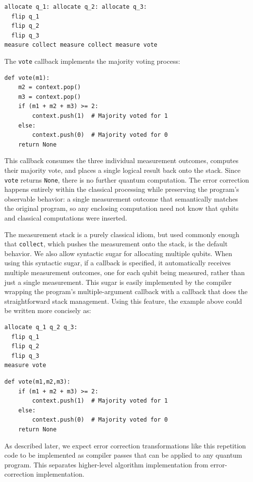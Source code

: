 \begin{verbatim}
allocate q_1: allocate q_2: allocate q_3:
  flip q_1
  flip q_2
  flip q_3
measure collect measure collect measure vote
\end{verbatim}

The \texttt{vote} callback implements the majority voting process:

\begin{verbatim}
def vote(m1):
    m2 = context.pop()
    m3 = context.pop()
    if (m1 + m2 + m3) >= 2:
        context.push(1)  # Majority voted for 1
    else:
        context.push(0)  # Majority voted for 0
    return None
\end{verbatim}

This callback consumes the three individual measurement outcomes, computes their majority vote, and places a single logical result back onto the stack. Since \texttt{vote} returns \texttt{None}, there is no further quantum computation.  The error correction happens entirely within the classical processing while preserving the program's observable behavior: a single measurement outcome that semantically matches the original program, so any enclosing computation need not know that qubits and classical computations were inserted.

The measurement stack is a purely classical idiom, but used commonly enough that \texttt{collect}, which pushes the measurement onto the stack, is the default behavior. We also allow syntactic sugar for allocating multiple qubits. When using this syntactic sugar, if a callback is specified, it automatically receives multiple measurement outcomes, one for each qubit being measured, rather than just a single measurement. This sugar is easily implemented by the compiler wrapping the program's multiple-argument callback with a callback that does the straightforward stack management. Using this feature, the example above could be written more concisely as:
\begin{verbatim}
allocate q_1 q_2 q_3:
  flip q_1
  flip q_2
  flip q_3
measure vote
\end{verbatim}

\begin{verbatim}
def vote(m1,m2,m3):
    if (m1 + m2 + m3) >= 2:
        context.push(1)  # Majority voted for 1
    else:
        context.push(0)  # Majority voted for 0
    return None
\end{verbatim}
As described later, we expect error correction transformations like this repetition code to be implemented as compiler passes that can be applied to any quantum program. This separates higher-level algorithm implementation from error-correction implementation.

